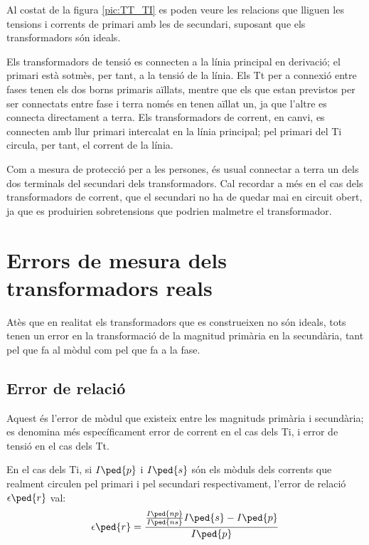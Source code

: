 Al costat de la figura
\vref{pic:TT_TI} es poden veure les relacions que lliguen les
tensions i corrents de primari amb les de secundari, suposant que
els transformadors són ideals.


Els transformadors de tensió es connecten a la línia principal en
derivació; el  primari està sotmès, per tant, a la tensió de la
línia. Els Tt per a connexió entre fases tenen els dos borns
primaris aïllats, mentre que els que estan previstos per ser
connectats entre fase i terra només en tenen aïllat un, ja que
l'altre es connecta directament a terra. Els transformadors de
corrent, en canvi, es connecten amb llur primari intercalat en la
línia principal;  pel primari del Ti circula, per tant, el corrent
 de la línia.

 Com a mesura de protecció per a les persones, és usual
connectar a terra un dels dos terminals del secundari dels
transformadors. Cal recordar a més en el cas dels transformadors de
corrent, que el secundari no ha de quedar mai en circuit obert, ja
que es produirien sobretensions que podrien malmetre el
transformador.

\section{Errors de mesura dels transformadors reals}

Atès que en realitat els transformadors que es construeixen no són
ideals, tots tenen un error en la transformació de la magnitud
primària en la secundària, tant pel que fa al mòdul com pel que fa
a la fase.

\subsection{Error de relació}

Aquest és l'error de mòdul que existeix entre les magnituds primària i
secundària; es denomina més específicament error de corrent en el
cas dels Ti, i error de tensió en el cas dels Tt.

En el cas dels Ti, si $I\ped{p}$ i $I\ped{s}$ són els mòduls dels corrents que
realment circulen pel primari i pel secundari respectivament,
l'error de relació $\epsilon\ped{r}$ val:
\begin{equation}
    \epsilon\ped{r} = \frac{\frac{I\ped{np}}{I\ped{ns}} I\ped{s} - I\ped{p}} {I\ped{p}}
\end{equation}

